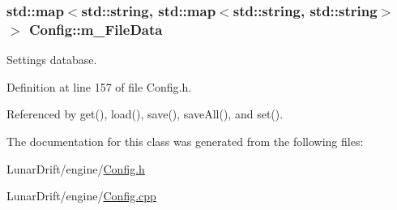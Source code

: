 \subsubsection[{\texorpdfstring{m\+\_\+\+File\+Data}{m_FileData}}]{\setlength{\rightskip}{0pt plus 5cm}std\+::map$<$std\+::string, std\+::map$<$std\+::string, std\+::string$>$ $>$ Config\+::m\+\_\+\+File\+Data\hspace{0.3cm}{\ttfamily [private]}}\hypertarget{class_config_a5c864239797e10af1a62b292d7ededad}{}\label{class_config_a5c864239797e10af1a62b292d7ededad}


Settings database. 



Definition at line 157 of file Config.\+h.



Referenced by get(), load(), save(), save\+All(), and set().



The documentation for this class was generated from the following files\+:\begin{DoxyCompactItemize}
\item 
Lunar\+Drift/engine/\hyperlink{_config_8h}{Config.\+h}\item 
Lunar\+Drift/engine/\hyperlink{_config_8cpp}{Config.\+cpp}\end{DoxyCompactItemize}
